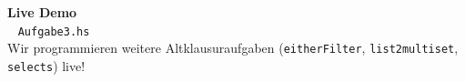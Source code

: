 \documentclass[aspectratio=169,11pt]{beamer}
\begin{document}
\begin{frame}[plain]
    \begin{center}
        \Huge \textbf{Live Demo} \\
        \vspace{0.5cm}
        \large \faLaptopCode~ \texttt{Aufgabe3.hs} \\
        \vspace{0.3cm}
        \normalsize Wir programmieren weitere Altklausuraufgaben (\texttt{eitherFilter}, \texttt{list2multiset}, \texttt{selects}) live!
\vspace{0.5cm}\begin{center}\href{https://moodle.uni-ulm.de/pluginfile.php/1348606/mod_folder/content/0/2024_1_exam.pdf}{}\quad\href{https://moodle.uni-ulm.de/pluginfile.php/1348606/mod_folder/content/0/2024_2_exam.pdf}{}\end{center}
    \end{center}
\end{frame}
\end{document}
